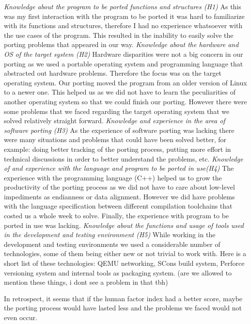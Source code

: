 \textit{Knowledge about the program to be ported functions and structures (H1)} 
As this was my first interaction with the program to be ported it was hard to
familiarize with its functions and structures, therefore I had no experience
whatsoever with the use cases of the program. This resulted in the inability to
easily solve the porting problems that appeared in our way.
\textit{Knowledge about the hardware and OS of the target system (H2)}
Hardware disparities were not a big concern in our porting as we used a portable
operating system and programming language that abstracted out hardware problems.
Therefore the focus was on the target operating system. Our porting moved the
program from an older version of Linux to a newer one. This helped us as we
did not have to learn the peculiarities of another operating system so that we
could finish our porting. However there were some problems that we faced
regarding the target operating system that we solved relatively straight
forward.
\textit{Knowledge and experience in the area of software porting (H3)}
As the experience of software porting was lacking there were many situations
and problems that could have been solved better, for example: doing better
tracking of the porting process, putting more effort in technical discussions
in order to better understand the problems, etc.
\textit{Knowledge of and experience with the language and program to be ported
in use(H4)}
The experience with the programming language (C++) helped us to grow the
productivity of the porting process as we did not have to care about low-level
impediments as endianness or data alignment. However we did have problems with
the language specification between different compilation toolchains that costed
us a whole week to solve. Finally, the experience with program to be ported in
use was lacking.
\textit{Knowledge about the functions and usage of tools used in the development
and testing environment (H5)}
While working in the development and testing environments we used a considerable
number of technologies, some of them being either new or not trivial to work
with. Here is a short list of these technologies: QEMU networking, SCons build
system, Perforce versioning system and internal tools as packaging system. (are
we allowed to mention these things, i dont see a problem in that tbh)

In retrospect, it seems that if the human factor index had a better score, maybe
the porting process would have lasted less and the problems we faced would not
even occur.
